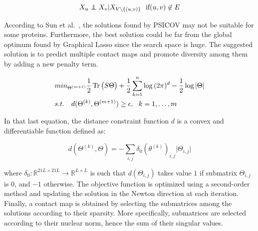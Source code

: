         \begin{equation}
            X_u \independent X_v \vert X_{V \setminus \{(u,v)\}} \ \ \text{if} (u, v) \not\in E
        \end{equation}
        \todo{}



        According to Sun et al.~\cite{doi:10.1093/nar/gky995}, the solutions found by PSICOV may not be suitable for some proteins.
        Furthermore, the best solution could be far from the global optimum found by Graphical Lasso since the search space is huge.
        The suggested solution is to predict multiple contact maps and promote diversity among them by adding a new penalty term.

        \begin{equation}\label{mbest}
            \begin{split}
                & min_{\Theta^{(m+1)}} \frac{1}{2} \operatorname{Tr}\big(S \Theta\big) + \frac{1}{2} 
                    \sum\limits_{k=1}^{n} \log{(2\pi)^d} - \frac{1}{2} \log{\vert\Theta\vert} \\
                & s.t. \ \ \ d(\Theta^{(k)}, \Theta^{(m+1)}) \ge \epsilon, \ \ k = 1, \dotsc, m
            \end{split}
        \end{equation}

        In that last equation, the distance constraint function $d$ is a convex and differentiable function defined as:

        \begin{equation}
            d(\Theta^{(k)}, \Theta) = - \sum\limits_{i, j} \delta_0(\theta^{(k)})_{i, j} \vert \Theta_{i, j} \vert
        \end{equation}

        where $\delta_0: \mathbb{R}^{21L \times 21L} \rightarrow \mathbb{R}^{L \times L}$ is such that 
        $d(\Theta_{i, j})$ takes value $1$ if submatrix $\Theta_{i, j}$ is $0$, and $-1$ otherwise.
        The objective function is optimized using a second-order method and updating the solution in the Newton direction at each iteration.
        Finally, a contact map is obtained by selecting the submatrices among the solutions according to their sparsity.
        More specifically, submatrices are selected according to their nuclear norm, hence the sum of their singular values.
